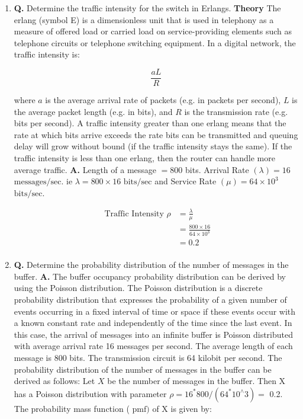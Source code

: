 \documentclass[main.tex]{subfiles}
\begin{document}
\begin{enumerate}
    \begin{enumerate}
        \item \textbf{Q.} Determine the traffic intensity for the switch in Erlangs. \textbf{Theory} The erlang (symbol E) is a dimensionless unit that is used in telephony as a measure of offered load or carried load on service-providing elements such as telephone circuits or telephone switching equipment. In a digital network, the traffic intensity is:
        
        $$
        \frac{a L}{R}
        $$
        
        where $a$ is the average arrival rate of packets (e.g. in packets per second), $L$ is the average packet length (e.g. in bits), and $R$ is the transmission rate (e.g. bits per second). A traffic intensity greater than one erlang means that the rate at which bits arrive exceeds the rate bits can be transmitted and queuing delay will grow without bound (if the traffic intensity stays the same). If the traffic intensity is less than one erlang, then the router can handle more average traffic. \textbf{A.} Length of a message $=800$ bits. Arrival Rate $(\lambda)=16$ $\mathrm{messages}/\mathrm{sec}$. ie $\lambda=800 \times 16$ $\mathrm{bits}/\mathrm{sec}$ and Service Rate $(\mu)=64 \times 10^3$ $\mathrm{bits}/\mathrm{sec}$. 
        
        $$
        \begin{aligned}
        \text { Traffic Intensity } \rho& =\frac{\lambda}{\mu} \\
        & =\frac{800 \times 16}{64 \times 10^3} \\
        & =0.2 \\
        \end{aligned}
        $$

        \item \textbf{Q.} Determine the probability distribution of the number of messages in the buffer. \textbf{A.} The buffer occupancy probability distribution can be derived by using the Poisson distribution. The Poisson distribution is a discrete probability distribution that expresses the probability of a given number of events occurring in a fixed interval of time or space if these events occur with a known constant rate and independently of the time since the last event. In this case, the arrival of messages into an infinite buffer is Poisson distributed with average arrival rate 16 messages per second. The average length of each message is 800 bits. The transmission circuit is 64 kilobit per second. The probability distribution of the number of messages in the buffer can be derived as follows: Let $X$ be the number of messages in the buffer. Then $\mathrm{X}$ has a Poisson distribution with parameter $\rho=16^* 800 /\left(64^* 10^{\wedge} 3\right)=$ 0.2. The probability mass function ( $\mathrm{pmf})$ of $\mathrm{X}$ is given by:
        

\end{enumerate}
\end{enumerate}
\end{document}
